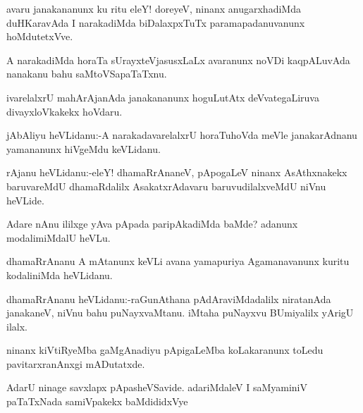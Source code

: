 \documentclass{article}
\begin{document}
\begin{mn}%
avaru janakananunx ku ritu eleY! doreyeV, ninanx anugarxhadiMda duHKaravAda I narakadiMda 
biDalaxpxTuTx paramapadanuvanunx hoMdutetxVve.
\end{mn}

\begin{mn}%
A narakadiMda horaTa sUrayxteVjasusxLaLx avaranunx noVDi kaqpALuvAda nanakanu bahu 
saMtoVSapaTaTxnu.
\end{mn}

\begin{mn}%
ivarelalxrU mahArAjanAda janakananunx hoguLutAtx deVvategaLiruva divayxloVkakekx hoVdaru.
\end{mn}



\begin{mn}%
jAbAliyu heVLidanu:-A narakadavarelalxrU horaTuhoVda meVle janakarAdnanu yamananunx 
hiVgeMdu keVLidanu.
\end{mn}

\begin{mn}%
rAjanu heVLidanu:-eleY! dhamaRrAnaneV, pApogaLeV ninanx AsAthxnakekx baruvareMdU 
dhamaRdalilx AsakatxrAdavaru baruvudilalxveMdU niVnu heVLide.
\end{mn}

\begin{mn}%
Adare nAnu ililxge yAva pApada paripAkadiMda baMde? adanunx modalimiMdalU heVLu.
\end{mn}

\begin{mn}%
dhamaRrAnanu A mAtanunx keVLi avana yamapuriya Agamanavanunx kuritu kodaliniMda heVLidanu.
\end{mn}

\begin{mn}%
dhamaRrAnanu heVLidanu:-raGunAthana pAdAraviMdadalilx niratanAda janakaneV, niVnu bahu 
puNayxvaMtanu. iMtaha puNayxvu BUmiyalilx yArigU ilalx.
\end{mn}

\begin{mn}%
ninanx kiVtiRyeMba gaMgAnadiyu pApigaLeMba koLakaranunx toLedu pavitarxranAnxgi mADutatxde.
\end{mn}

\begin{mn}%
AdarU ninage savxlapx pApasheVSavide. adariMdaleV I saMyaminiV paTaTxNada samiVpakekx 
baMdididxVye
\end{mn}
\end{document}
